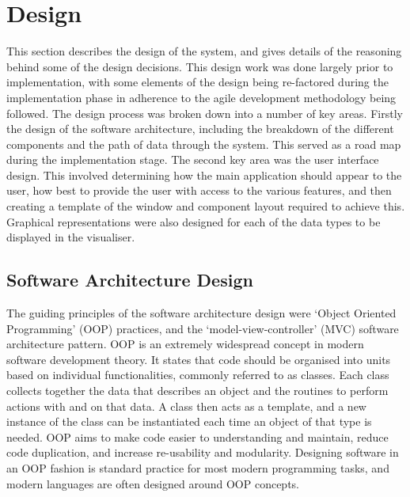 
\chapter[Design]{Design} %

\label{Chapter8} %


This section describes the design of the system, and gives details of the reasoning behind some of the design decisions. This design work was done largely prior to implementation, with some elements of the design being re-factored during the implementation phase in adherence to the agile development methodology being followed. The design process was broken down into a number of key areas. Firstly the design of the software architecture, including the breakdown of the different components and the path of data through the system. This served as a road map during the implementation stage. The second key area was the user interface design. This involved determining how the main application should appear to the user, how best to provide the user with access to the various features, and then creating a template of the window and component layout required to achieve this. Graphical representations were also designed for each of the data types to be displayed in the visualiser.


\section{Software Architecture Design} \label{SoftwareArchitectureDesign}
The guiding principles of the software architecture design were `Object Oriented Programming' (OOP) practices, and the `model-view-controller' (MVC) software architecture pattern. OOP \cite{OOP} is an extremely widespread concept in modern software development theory. It states that code should be organised into units based on individual functionalities, commonly referred to as classes. Each class collects together the data that describes an object and the routines to perform actions with and on that data. A class then acts as a template, and a new instance of the class can be instantiated each time an object of that type is needed. OOP aims to make code easier to understanding and maintain, reduce code duplication, and increase re-usability and modularity. Designing software in an OOP fashion is standard practice for most modern programming tasks, and modern languages are often designed around OOP concepts.

